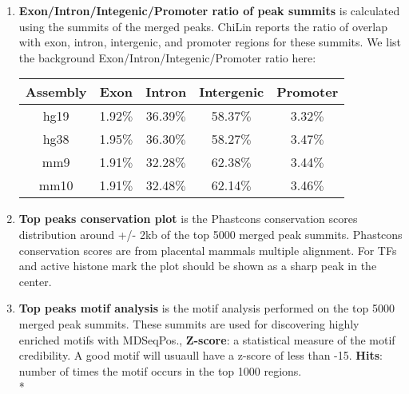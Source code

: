 \begin{enumerate}
 \item{\textbf{Exon/Intron/Integenic/Promoter ratio of peak summits} is calculated using the summits of the merged peaks. ChiLin reports the ratio of overlap with exon, intron, intergenic, and promoter regions for these summits.\newline}
   We list the background Exon/Intron/Integenic/Promoter ratio here: \newline
   \begin{center}
   \begin{tabular}{ccccc}
     \toprule
     Assembly & Exon & Intron & Intergenic & Promoter \\
     \midrule
     hg19 & 1.92$\%$ & 36.39$\%$ & 58.37$\%$ & 3.32$\%$ \\
     \midrule
     hg38 & 1.95$\%$ & 36.30$\%$ & 58.27$\%$ & 3.47$\%$ \\
     \midrule
     mm9 & 1.91$\%$ & 32.28$\%$ & 62.38$\%$ & 3.44$\%$ \\
     \midrule
     mm10 & 1.91$\%$ & 32.48$\%$ & 62.14$\%$ & 3.46$\%$ \\
     \bottomrule
   \end{tabular}
   \end{center}

 \item{\textbf{Top peaks conservation plot} is the Phastcons conservation scores distribution around +/- 2kb of the top 5000 merged peak summits. Phastcons conservation scores are from placental mammals multiple alignment. For TFs and active histone mark the plot should be shown as a sharp peak in the center.}
 \item{\textbf{Top peaks motif analysis} is the motif analysis performed on the top 5000 merged peak summits. These summits are used for discovering highly enriched motifs with MDSeqPos.}, {\bf Z-score}: a statistical measure of the motif credibility. A good motif will usuaull have a z-score of less than -15. {\bf Hits}: number of times the motif occurs in the top 1000 regions. \\*
\end{enumerate}

